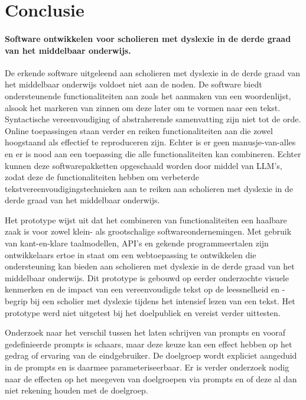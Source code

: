 
\chapter{Conclusie}%
\label{ch:conclusie}

\subsubsection{Software ontwikkelen voor scholieren met dyslexie in de derde graad van het middelbaar onderwijs.}

De erkende software uitgeleend aan scholieren met dyslexie in de derde graad van het middelbaar onderwijs voldoet niet aan de noden. De software biedt ondersteunende functionaliteiten aan zoals het aanmaken van een woordenlijst, alsook het markeren van zinnen om deze later om te vormen naar een tekst. Syntactische vereenvoudiging of abstraherende samenvatting zijn niet tot de orde. Online toepassingen staan verder en reiken functionaliteiten aan die zowel hoogstaand als effectief te reproduceren zijn. Echter is er geen manusje-van-alles en er is nood aan een toepassing die alle functionaliteiten kan combineren. Echter kunnen deze softwarepakketten opgeschaald worden door middel van LLM's, zodat deze de functionaliteiten hebben om verbeterde tekstvereenvoudigingstechnieken aan te reiken aan scholieren met dyslexie in de derde graad van het middelbaar onderwijs. 

\medskip

Het prototype wijst uit dat het combineren van functionaliteiten een haalbare zaak is voor zowel klein- als grootschalige softwareondernemingen. Met gebruik van kant-en-klare taalmodellen, API's en gekende programmeertalen zijn ontwikkelaars ertoe in staat om een webtoepassing te ontwikkelen die ondersteuning kan bieden aan scholieren met dyslexie in de derde graad van het middelbaar onderwijs. Dit prototype is gebouwd op eerder onderzochte visuele kenmerken en de impact van een vereenvoudigde tekst op de leessnelheid en -begrip bij een scholier met dyslexie tijdens het intensief lezen van een tekst. Het prototype werd niet uitgetest bij het doelpubliek en vereist verder uittesten. 

\medskip

Onderzoek naar het verschil tussen het laten schrijven van prompts en vooraf gedefinieerde prompts is schaars, maar deze keuze kan een effect hebben op het gedrag of ervaring van de eindgebruiker. De doelgroep wordt expliciet aangeduid in de prompts en is daarmee parameteriseerbaar. Er is verder onderzoek nodig naar de effecten op het meegeven van doelgroepen via prompts en of deze al dan niet rekening houden met de doelgroep.

